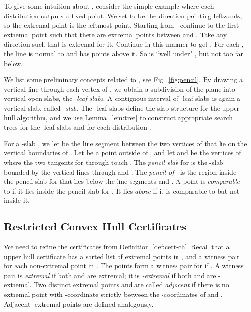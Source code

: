 \documentclass[letterpaper,11pt]{article}
\begin{document}
To give some intuition about , consider the simple example
where each distribution outputs a fixed point. We set  to be the direction
pointing leftwards, so the extremal point  is the leftmost point.
Starting from , continue to the first extremal point  such that
there are  extremal points between  and . Take any
direction  such that  is extremal for it. Continue in this manner
to get . For each , the line  is normal to  and has  points
above it. So  is ``well under" , but not too far
below.


We list some preliminary concepts related to ,
see Fig.~\ref{fig:pencil}.
By drawing a vertical line through each 
vertex of , we obtain a subdivision of 
the plane into vertical open slabs, the 
\emph{-leaf-slabs}. A contiguous
interval of -leaf slabs is again a 
vertical slab, called \emph{-slab}.
The -leaf-slabs define the slab 
structure for the upper hull algorithm, 
and we use Lemma~\ref{lem:tree} to construct 
appropriate search trees  for 
the -leaf slabs and for each   
distribution .

For a -slab , we let  
be the line segment between the two vertices of 
 that lie on the vertical boundaries of .
Let  be a point outside of , and let  
and  be the vertices of  where the 
two tangents for  through  touch 
. The \emph{pencil slab} for  is the
-slab bounded by the vertical lines through 
 and .  The \emph{pencil of }, 
 is the region inside the pencil slab for 
 that lies below the line segments  
and .  A point  is 
\emph{comparable} to  if it lies 
inside the pencil slab for . It lies 
\emph{above}  if it is comparable to
 but not inside it.

\subsection{Restricted Convex Hull Certificates}\label{sec:ch-cert}

We need to refine the certificates from 
Definition~\ref{def:cert-ch}.
Recall that a upper hull certificate
has a sorted list of extremal points 
in , and a witness pair for each 
non-extremal point in . The points 
 form a witness pair for  
if .
A witness pair  is 
\emph{extremal} if both  and
 are extremal; it is
\emph{\textup{}-extremal}
if both  and  are 
-extremal.  Two distinct 
extremal points  and  are 
called \emph{adjacent} if there is no 
extremal point with -coordinate 
strictly between
the -coordinates of  and . 
Adjacent -extremal points
are defined analogously.
\end{document}
